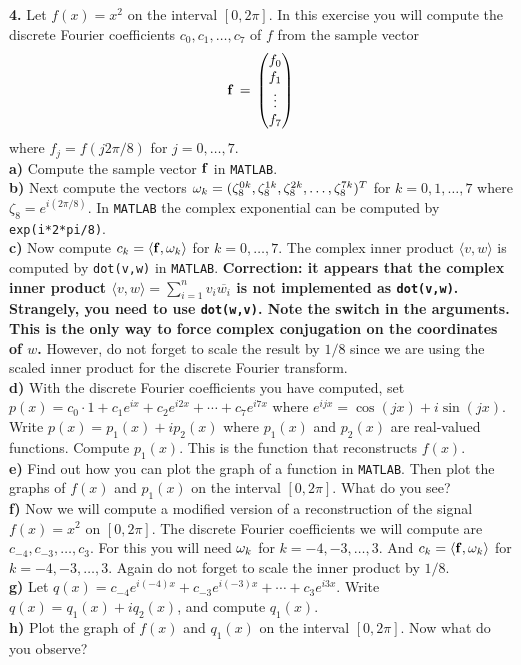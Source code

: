 \documentclass[11pt]{amsart}
\theoremstyle{definition}  %
\begin{document}
\noindent
{\bf 4.} Let $f(x)  = x^2$ on the interval $[0,2\pi]$. In this exercise you will compute the discrete Fourier coefficients  $c_0, c_1, \ldots, c_7$ of $f$ from the sample vector
$$ {\bf f} \, = \, \begin{pmatrix} f_0 \\ f_1 \\ \vdots \\ f_7 \end{pmatrix}$$
where $f_j = f(j2\pi/8)$ for $j=0,\ldots, 7$. \\
{\bf a)} Compute the sample vector ${\bf f}$ in {\tt MATLAB}. \\
{\bf b)} Next compute the vectors ${\bf \omega}_k  = (\zeta_8^{0k}, \zeta_8^{1k}, \zeta_8^{2k}, \ldots, \zeta_8^{7k})^T$ for $k=0,1, \ldots, 7$ where $\zeta_8 = e^{i(2\pi/8)}$.
In {\tt MATLAB} the complex exponential can be computed by {\tt exp(i*2*pi/8)}.\\
{\bf c)} Now compute $c_k = \langle {\bf f}, {\bf \omega}_k \rangle$ for $k=0, \ldots, 7$. The complex inner product $\langle v, w \rangle$ is computed by {\tt dot(v,w)} in {\tt MATLAB}.
{\bf Correction: it appears that the complex inner product $\langle v , w \rangle = \sum_{i=1}^n v_i \overline{w_i}$ is not implemented as {\tt dot(v,w)}. Strangely, you need to use
{\tt dot(w,v)}. Note the switch in the arguments. This is the only way to force complex conjugation on the coordinates of $w$. }
However, do not forget to scale the result by $1/8$ since we are using the scaled inner product for the discrete Fourier transform. \\
{\bf d)} With the discrete Fourier coefficients you have computed, set $p(x) = c_0 \cdot 1 + c_1 e^{ix} + c_2 e^{i2x} + \cdots + c_7 e^{i7x}$ where $e^{ijx} = \cos(jx) + i \sin(jx)$.
Write $p(x) = p_1(x) + i p_2(x)$ where $p_1(x)$ and $p_2(x)$ are real-valued functions. Compute $p_1(x)$. This is the function that reconstructs $f(x)$. \\
{\bf e)} Find out how you can plot the graph of a function in {\tt MATLAB}. Then plot the graphs of $f(x)$ and $p_1(x)$ on the interval $[0,2\pi]$. What do you see? \\
{\bf f)} Now we will compute a modified version of a reconstruction of the signal $f(x) = x^2$ on $[0,2\pi]$.  The discrete Fourier coefficients we will compute are $c_{-4}, c_{-3}, \ldots, c_3$.
For this you will need ${\bf \omega}_k$ for $k=-4, -3, \ldots, 3$. And $c_k = \langle {\bf f}, {\bf \omega}_k \rangle$ for $k=-4, -3, \ldots, 3$. Again do not forget to scale the inner product by
$1/8$. \\
{\bf g)} Let $q(x) = c_{-4} e^{i(-4)x} + c_{-3} e^{i(-3)x} + \cdots + c_3 e^{i3x}$. Write $q(x)  = q_1(x) + i q_2(x)$, and compute $q_1(x)$. \\
{\bf h)} Plot the graph of $f(x)$ and $q_1(x)$ on the interval $[0,2\pi]$. Now what do you observe? 






 
\end{document}
